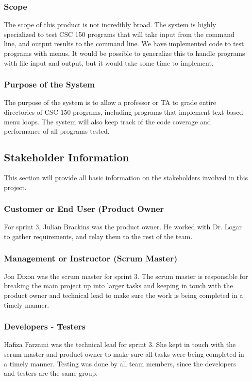 \documentclass {article}
\begin{document}
	 		\subsubsection{\large{\color{cyan}Scope}}
	 			The scope of this product is not incredibly broad. The system is
	 			 highly specialized to test CSC 150 programs that will take input
	 			 from the command line, and output results to the command line.
	 			 We have implemented code to test programs with menus. It would be
	 			 possible to generalize this to handle programs with file input
	 			 and output, but it would take some time to implement.
		 		
	 		\subsubsection{\large{\color{cyan}Purpose of the System}}
	 			The purpose of the system is to allow a professor or TA to grade
	 			 entire directories of CSC 150 programs, including programs that
	 			 implement text-based menu loops. The system will also keep track
	 			 of the code coverage and performance of all programs tested.
	 			 
	 	\subsection{\Large{\color{blue}Stakeholder Information}}
	 		This section will provide all basic information on the stakeholders
	 		 involved in this project.
	 		
	 		\subsubsection{\large{\color{cyan}Customer or End User (Product Owner}}
	 			For sprint 3, Julian Brackins was the product owner. He worked with
	 			 Dr. Logar to gather requirements, and relay them to the rest of
	 			 the team.
	 		
	 		\subsubsection{\large{\color{cyan}Management or Instructor (Scrum Master)}}
	 			Jon Dixon was the scrum master for sprint 3. The scrum master
	 			 is responsible for breaking the main project up into larger tasks
	 			 and keeping in touch with the product owner and technical lead
	 			 to make sure the work is being completed in a timely manner.
	 			 
	 		\subsubsection{\large{\color{cyan}Developers - Testers}}
	 			Hafiza Farzami was the technical lead for sprint 3. She kept in
	 			 touch with the scrum master and product owner to make sure all
	 			 tasks were being completed in a timely manner. Testing was done
	 			 by all team members, since the developers and testers are the
	 			 same group.
	 			 
\end{document}
